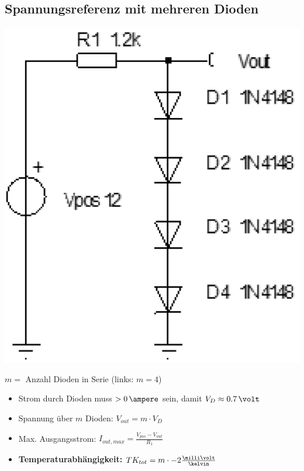\subsection{Spannungsreferenz mit mehreren Dioden}

\begin{minipage}[c]{0.25\columnwidth}
    \includegraphics[width=\columnwidth]{images/spannungsreferenz_4_dioden.png}
\end{minipage}
\hfill
\begin{minipage}[c]{0.73\columnwidth}
    $m = $ Anzahl Dioden in Serie (links: $m = 4$) 

    \begin{itemize}
        \item Strom durch Dioden muss $> 0 \, \ampere$ sein, damit $V_D \approx 0.7 \, \volt$
        \item Spannung über $m$ Dioden: $ \boxed{ V_{out} = m \cdot V_D }$
        \item Max. Ausgangsstrom: $ \boxed{I_{out, max} =  \frac{V_{pos} - V_{out}}{R_1}} $
        \item \textbf{Temperaturabhängigkeit:} $TK_{tot} = m \cdot -2 \frac{\milli \volt}{\kelvin}$
    \end{itemize}

\end{minipage}


